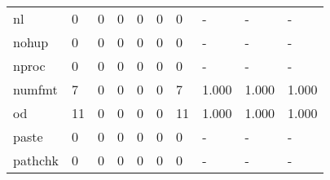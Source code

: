 \begin{longtable}{lp{1.3cm}p{1.3cm}p{1.3cm}p{1.3cm}p{1.3cm}p{1.3cm}p{1.3cm}p{1.3cm}p{1.3cm}}
nl        &                      0 &                                  0 &                                 0 &                                0 &                                 0 &                               0 &                                    - &                                      - &                                    - \\
nohup     &                      0 &                                  0 &                                 0 &                                0 &                                 0 &                               0 &                                    - &                                      - &                                    - \\
nproc     &                      0 &                                  0 &                                 0 &                                0 &                                 0 &                               0 &                                    - &                                      - &                                    - \\
numfmt    &                      7 &                                  0 &                                 0 &                                0 &                                 0 &                               7 &                                1.000 &                                  1.000 &                                1.000 \\
od        &                     11 &                                  0 &                                 0 &                                0 &                                 0 &                              11 &                                1.000 &                                  1.000 &                                1.000 \\
paste     &                      0 &                                  0 &                                 0 &                                0 &                                 0 &                               0 &                                    - &                                      - &                                    - \\
pathchk   &                      0 &                                  0 &                                 0 &                                0 &                                 0 &                               0 &                                    - &                                      - &                                    - \\

\end{longtable}

